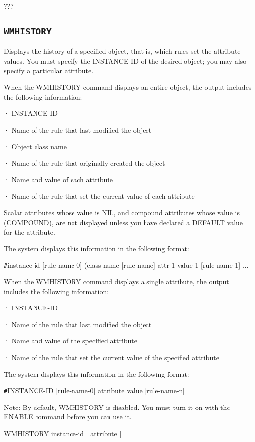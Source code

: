 {{???

\subsection{\tt{WMHISTORY}}

Displays the history of a specified object, that is, which
rules set the attribute values. You must specify the
INSTANCE-ID of the desired object; you may also specify a
particular attribute.

When the WMHISTORY command displays an entire object, the
output includes the following information:

·  INSTANCE-ID

·  Name of the rule that last modified the object

·  Object class name

·  Name of the rule that originally created the object

·  Name and value of each attribute

·  Name of the rule that set the current value of each
attribute

Scalar attributes whose value is NIL, and compound attributes
whose value is (COMPOUND), are not displayed unless you have
declared a DEFAULT value for the attribute.

The system displays this information in the following format:

\verb|#|instance-id [rule-name-0] (class-name [rule-name] { \ct attr-1
value-1 [rule-name-1] } ...

When the WMHISTORY command displays a single attribute, the
output includes the following information:

·  INSTANCE-ID

·  Name of the rule that last modified the object

·  Name and value of the specified attribute

·  Name of the rule that set the current value of the
specified attribute

The system displays this information in the following format:

\verb|#|INSTANCE-ID [rule-name-0] \ct attribute value [rule-name-n]

Note:  By default, WMHISTORY is disabled. You must turn it on
with the ENABLE command before you can use it.

\Format

WMHISTORY instance-id [ \ct attribute ]

\Arguments

}}
